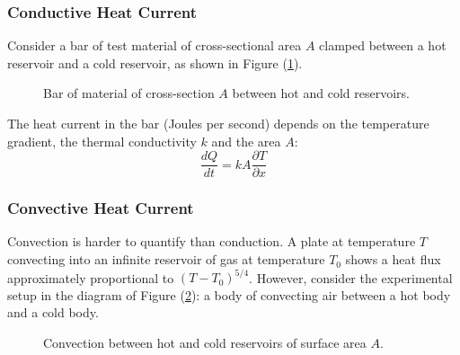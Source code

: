\documentclass[12pt, a4paper, twoside, openright]{book}
\begin{document}
\subsubsection{Conductive Heat Current}
Consider a bar of test material of cross-sectional area $A$ clamped between a hot reservoir and a cold reservoir, as shown in Figure (\ref{conduction}).

\begin{figure}[ht]
\centering
{}
\caption{Bar of material of cross-section $A$ between hot and cold reservoirs.}\label{conduction}
\end{figure}

The heat current in the bar (Joules per second) depends on the temperature gradient, the thermal conductivity $k$ and the area $A$:
\begin{equation}
\frac{dQ}{dt} = k A \frac{\partial T}{\partial x}
\end{equation}


\subsubsection{Convective Heat Current}
Convection is harder to quantify than conduction.   
A plate at temperature $T$ convecting into an infinite reservoir of gas at temperature $T_0$ shows a heat flux approximately proportional to $(T - T_0)^{5/4}$.
However, consider the experimental setup in the diagram of Figure (\ref{convection}): a body of convecting air between a hot body and a cold body.


\begin{figure}[ht]
\centering
{}
\caption{Convection between hot and cold reservoirs of surface area $A$.}\label{convection}
\end{figure}
\end{document}
